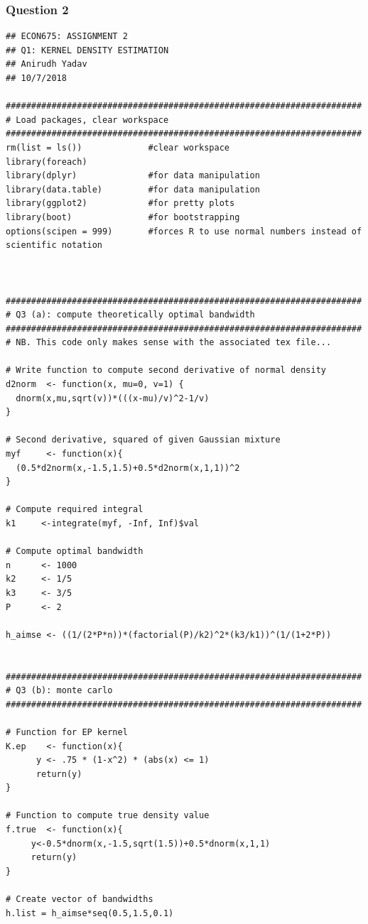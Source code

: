 \documentclass[12pt]{article}
\begin{document}
\subsubsection{Question 2}
\begin{verbatim}
## ECON675: ASSIGNMENT 2
## Q1: KERNEL DENSITY ESTIMATION
## Anirudh Yadav 
## 10/7/2018

######################################################################
# Load packages, clear workspace
######################################################################
rm(list = ls())             #clear workspace
library(foreach)
library(dplyr)              #for data manipulation
library(data.table)         #for data manipulation
library(ggplot2)            #for pretty plots
library(boot)               #for bootstrapping
options(scipen = 999)       #forces R to use normal numbers instead of scientific notation



######################################################################
# Q3 (a): compute theoretically optimal bandwidth
######################################################################
# NB. This code only makes sense with the associated tex file...

# Write function to compute second derivative of normal density
d2norm  <- function(x, mu=0, v=1) {
  dnorm(x,mu,sqrt(v))*(((x-mu)/v)^2-1/v)
}

# Second derivative, squared of given Gaussian mixture
myf     <- function(x){
  (0.5*d2norm(x,-1.5,1.5)+0.5*d2norm(x,1,1))^2
}

# Compute required integral
k1     <-integrate(myf, -Inf, Inf)$val

# Compute optimal bandwidth
n      <- 1000
k2     <- 1/5
k3     <- 3/5
P      <- 2

h_aimse <- ((1/(2*P*n))*(factorial(P)/k2)^2*(k3/k1))^(1/(1+2*P))


######################################################################
# Q3 (b): monte carlo
######################################################################

# Function for EP kernel
K.ep    <- function(x){
      y <- .75 * (1-x^2) * (abs(x) <= 1)
      return(y)
}

# Function to compute true density value
f.true  <- function(x){
     y<-0.5*dnorm(x,-1.5,sqrt(1.5))+0.5*dnorm(x,1,1)
     return(y)
}

# Create vector of bandwidths
h.list = h_aimse*seq(0.5,1.5,0.1)


\end{verbatim}
\end{document}
